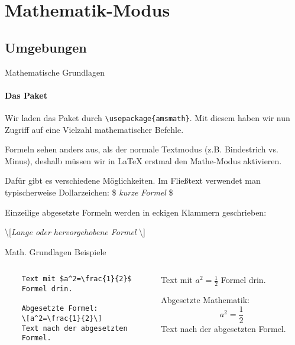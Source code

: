 \section{Mathematik-Modus}
\subsection{Umgebungen}
\begin{frame}[fragile]{Mathematische Grundlagen}
\framesubtitle{Das Paket }

\medskip\pause
Wir laden das Paket  durch \verb+\usepackage{amsmath}+. Mit diesem haben wir nun Zugriff auf eine Vielzahl mathematischer Befehle.

\medskip\pause
Formeln sehen anders aus, als der normale Textmodus (z.B. Bindestrich vs. Minus), deshalb müssen wir in \LaTeX{} erstmal den Mathe-Modus aktivieren.

\medskip\pause
Dafür gibt es verschiedene Möglichkeiten. Im Fließtext verwendet man typischerweise Dollarzeichen: \$ \emph{kurze Formel} \$

Einzeilige abgesetzte Formeln werden in eckigen Klammern geschrieben: 
\begin{center}
\textbackslash[\emph{Lange oder hervorgehobene Formel} \textbackslash]
\end{center}
\end{frame}

\begin{frame}[fragile]{Math. Grundlagen Beispiele}
\begin{columns}
\begin{column}{.48\textwidth}\footnotesize
\begin{codeblock}
\begin{verbatim}
	Text mit $a^2=\frac{1}{2}$
	Formel drin.

	Abgesetzte Formel:
	\[a^2=\frac{1}{2}\]
	Text nach der abgesetzten
	Formel.
\end{verbatim}
\end{codeblock}
\end{column}
%
\begin{column}{.45\textwidth}	\pause	
	Text mit $a^2=\frac{1}{2}$ Formel drin.
    
    \pause
	Abgesetzte Mathematik:
	\[a^2=\frac{1}{2}\]
	Text nach der abgesetzten Formel.
\end{column}
\end{columns}
\end{frame}





